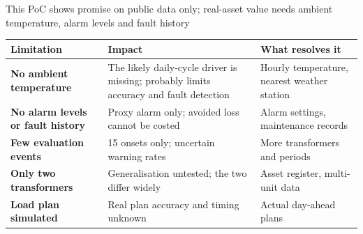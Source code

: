 \documentclass[aspectratio=169,10pt]{beamer}
\begin{document}
\begin{frame}{This PoC shows promise on public data only; real-asset value needs ambient temperature, alarm levels and fault history}
  \scriptsize
  \renewcommand{\arraystretch}{1.3}
  \begin{tabularx}{\textwidth}{>{\bfseries}p{3.4cm} X X}
    \toprule
    Limitation & Impact & What resolves it \\
    \midrule
    No ambient temperature & The likely daily-cycle driver is missing; probably limits accuracy and fault detection & Hourly temperature, nearest weather station \\
    No alarm levels or fault history & Proxy alarm only; avoided loss cannot be costed & Alarm settings, maintenance records \\
    Few evaluation events & 15 onsets only; uncertain warning rates & More transformers and periods \\
    Only two transformers & Generalisation untested; the two differ widely & Asset register, multi-unit data \\
    Load plan simulated & Real plan accuracy and timing unknown & Actual day-ahead plans \\
    \bottomrule
  \end{tabularx}
\end{frame}
\end{document}
